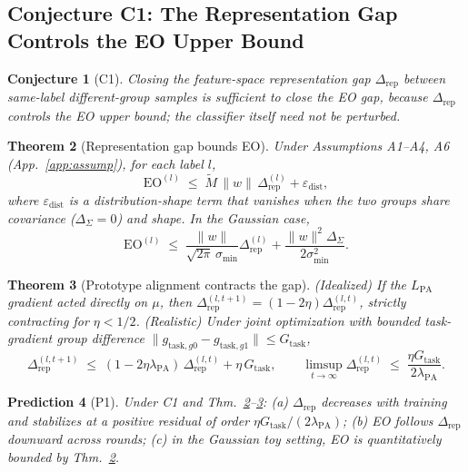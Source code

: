 \documentclass{article}
\newtheorem{theorem}{Theorem}
\newtheorem{conjecture}[theorem]{Conjecture}
\newtheorem{prediction}[theorem]{Prediction}
\newcommand{\sigm}{\sigma}
\newcommand{\rep}{\Delta_{\mathrm{rep}}}
\newcommand{\proto}{\mu}
\begin{document}
\subsection{Conjecture C1: The Representation Gap Controls the EO Upper Bound}
\label{sec:c1}
\begin{conjecture}[C1]\label{conj:c1}
Closing the feature-space representation gap $\rep$ between same-label
different-group samples is sufficient to close the EO gap, because $\rep$
controls the EO upper bound; the classifier itself need not be perturbed.
\end{conjecture}

\begin{theorem}[Representation gap bounds EO]\label{thm:upper}
Under Assumptions A1--A4, A6 (App.~\ref{app:assump}), for each label $l$,
\[
\mathrm{EO}^{(l)} \;\leq\; \tilde M\,\|w\|\, \rep^{(l)} + \varepsilon_{\mathrm{dist}},
\]
where $\varepsilon_{\mathrm{dist}}$ is a distribution-shape term that vanishes
when the two groups share covariance ($\Delta_\Sigma = 0$) and shape. In the
Gaussian case,
\[
\mathrm{EO}^{(l)} \;\leq\; \frac{\|w\|}{\sqrt{2\pi}\,\sigm_{\min}} \rep^{(l)}
  + \frac{\|w\|^2 \Delta_\Sigma}{2\sigm_{\min}^2}.
\]
\end{theorem}

\begin{theorem}[Prototype alignment contracts the gap]\label{thm:shrink}
(Idealized) If the $L_{\mathrm{PA}}$ gradient acted directly on $\proto$,
then $\rep^{(l,t+1)} = (1-2\eta)\rep^{(l,t)}$, strictly contracting for
$\eta < 1/2$.
(Realistic) Under joint optimization with bounded task-gradient group
difference $\|g_{\mathrm{task},g0} - g_{\mathrm{task},g1}\| \leq G_{\mathrm{task}}$,
\[
\rep^{(l,t+1)} \;\leq\; (1 - 2\eta\lambda_{\mathrm{PA}})\, \rep^{(l,t)} + \eta\, G_{\mathrm{task}},
\qquad \limsup_{t\to\infty} \rep^{(l,t)} \;\leq\; \frac{\eta G_{\mathrm{task}}}{2\lambda_{\mathrm{PA}}}.
\]
\end{theorem}

\begin{prediction}[P1]\label{pred:p1}
Under C1 and Thm.~\ref{thm:upper}--\ref{thm:shrink}: (a) $\rep$ decreases
with training and stabilizes at a positive residual of order
$\eta G_{\mathrm{task}} / (2\lambda_{\mathrm{PA}})$; (b) EO follows $\rep$
downward across rounds; (c) in the Gaussian toy setting, EO is
quantitatively bounded by Thm.~\ref{thm:upper}.
\end{prediction}
\end{document}
